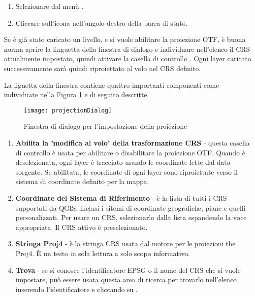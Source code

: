 \begin{enumerate}
\item Selezionare  dal menù
.
\item Cliccare sull'icona 
nell'angolo destro della barra di stato.
\end{enumerate}

Se è già stato caricato un livello, e si vuole abilitare la proiezione OTF, è
buona norma aprire la linguetta  della finestra di dialogo  e
individuare nell'elenco il CRS attualmente impostato, quindi attivare
la casella di controllo . Ogni layer caricato successivamente sarà quindi
riproiettato al volo nel CRS definito.

La liguetta  della finestra 
contiene quattro importanti componenti come individuate nella Figura \ref{fig:projections}
e di seguito descritte.

\begin{figure}[ht]
   \begin{center}
   \caption{Finestra di dialogo per l'impostazione della proiezione \nixcaption}\label{fig:projections}\smallskip
   \texttt{[image: projectionDialog]}
\end{center}  
\end{figure}

\begin{enumerate}
\item \textbf{Abilita la 'modifica al volo' della trasformazione CRS} -
questa casella di controllo è usata per abilitare o disabilitare la proiezione
OTF. Quando è deselezionata, ogni layer è tracciato usando le coordinate lette
dal dato sorgente. Se abilitata, le coordinate di ogni layer sono riproiettate
verso il sistema di coordinate definito per la mappa.
\item \textbf{Coordinate del Sistema di Riferimento} - è la lista di tutti i CRS
supportati da QGIS, inclusi i sitemi di coordinate geografiche, piane e
quelli personalizzati. Per usare un CRS, selezionarlo dalla lista espandendo
la voce appropriata. Il CRS attivo è preselezionato.
\item \textbf{Stringa Proj4} - è la stringa CRS usata dal motore per le
proiezioni the Proj4. È un testo in sola lettura a solo scopo informativo.
\item \textbf{Trova} - se si conosce l'identificatore EPSG o il nome del CRS
che si vuole impostare, può essere usata questa area di ricerca per trovarlo
nell'elenco inserendo l'identificatore e cliccando su .
\end{enumerate}

